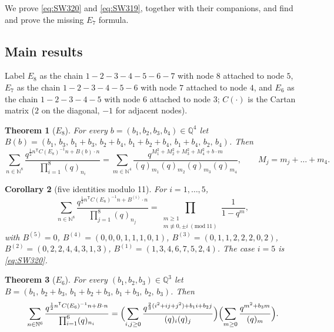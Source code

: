 \documentclass[11pt]{amsart}
\newtheorem{theorem}{Theorem}[section]
\newtheorem{corollary}[theorem]{Corollary}
\theoremstyle{definition}
\numberwithin{equation}{section}
\newcommand{\Q}{\mathbb{Q}}
\newcommand{\N}{\mathbb{N}}
\newcommand{\T}{\mathsf T}
\begin{document}
We prove \eqref{eq:SW320} and \eqref{eq:SW319}, together with their companions, and find and prove the
missing $E_7$ formula.

\subsection{Main results}
Label $E_8$ as the chain $1-2-3-4-5-6-7$ with node $8$ attached to node $5$, $E_7$ as the chain
$1-2-3-4-5-6$ with node $7$ attached to node $4$, and $E_6$ as the chain $1-2-3-4-5$ with node $6$
attached to node $3$; $C(\cdot)$ is the Cartan matrix ($2$ on the diagonal, $-1$ for adjacent nodes).

\begin{theorem}[$E_8$]\label{thm:E8}
For every $b=(b_1,b_2,b_3,b_4)\in\Q^4$ let
$B(b)=(b_1,\,b_3,\,b_1+b_3,\,b_2+b_4,\,b_1+b_2+b_4,\,b_1+b_4,\,b_2,\,b_4)$. Then
\begin{equation}\label{eq:E8}
\sum_{n\in\N^8}\frac{q^{\frac12n^{\T}C(E_8)^{-1}n+B(b)\cdot n}}{\prod_{i=1}^8(q)_{n_i}}
=\sum_{m\in\N^4}\frac{q^{M_1^2+M_2^2+M_3^2+M_4^2+b\cdot m}}{(q)_{m_1}(q)_{m_2}(q)_{m_3}(q)_{m_4}},
\qquad M_j=m_j+\dots+m_4 .
\end{equation}
\end{theorem}

\begin{corollary}[five identities modulo 11]\label{cor:E8}
For $i=1,\dots,5$,
\[
\sum_{n\in\N^8}\frac{q^{\frac12n^{\T}C(E_8)^{-1}n+B^{(i)}\cdot n}}{\prod_{j=1}^8(q)_{n_j}}
=\prod_{\substack{m\ge1\\m\not\equiv0,\pm i\ (\mathrm{mod}\ 11)}}\frac1{1-q^m},
\]
with $B^{(5)}=0$, $B^{(4)}=(0,0,0,1,1,1,0,1)$, $B^{(3)}=(0,1,1,2,2,2,0,2)$, $B^{(2)}=(0,2,2,4,4,3,1,3)$,
$B^{(1)}=(1,3,4,6,7,5,2,4)$. The case $i=5$ is \eqref{eq:SW320}.
\end{corollary}

\begin{theorem}[$E_6$]\label{thm:E6}
For every $(b_1,b_2,b_3)\in\Q^3$ let $B=(b_1,\,b_2+b_3,\,b_1+b_2+b_3,\,b_1+b_3,\,b_2,\,b_3)$. Then
\[
\sum_{n\in\N^6}\frac{q^{\frac12n^{\T}C(E_6)^{-1}n+B\cdot n}}{\prod_{i=1}^6(q)_{n_i}}
=\Bigl(\sum_{i,j\ge0}\frac{q^{\frac23(i^2+ij+j^2)+b_1i+b_2j}}{(q)_i(q)_j}\Bigr)\Bigl(\sum_{m\ge0}\frac{q^{m^2+b_3m}}{(q)_m}\Bigr).
\]
\end{theorem}
\end{document}
